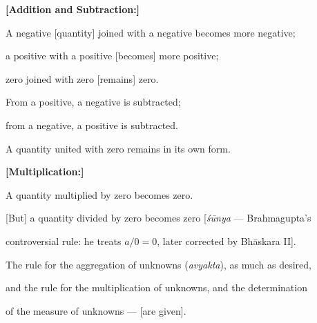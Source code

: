 \documentclass[10pt,a4paper]{article}
\begin{document}
\hfill\vline\hfill%

\begin{minipage}[t]{0.47\textwidth}

\textbf{[Addition and Subtraction:]}

A negative [quantity] joined with a negative becomes more negative;

a positive with a positive [becomes] more positive;

zero joined with zero [remains] zero.

From a positive, a negative is subtracted;

from a negative, a positive is subtracted.

A quantity united with zero remains in its own form.

\end{minipage}



\vspace{1.5em}



\begin{minipage}[t]{0.47\textwidth}


\end{minipage}%

\hfill\vline\hfill%

\begin{minipage}[t]{0.47\textwidth}

\textbf{[Multiplication:]}

A quantity multiplied by zero becomes zero.

[But] a quantity divided by zero becomes zero [\textit{śūnya} --- Brahmagupta's

controversial rule: he treats $a/0 = 0$, later corrected by Bhāskara II].



The rule for the aggregation of unknowns (\textit{avyakta}), as much as desired,

and the rule for the multiplication of unknowns, and the determination

of the measure of unknowns --- [are given].

\end{minipage}
\end{document}
